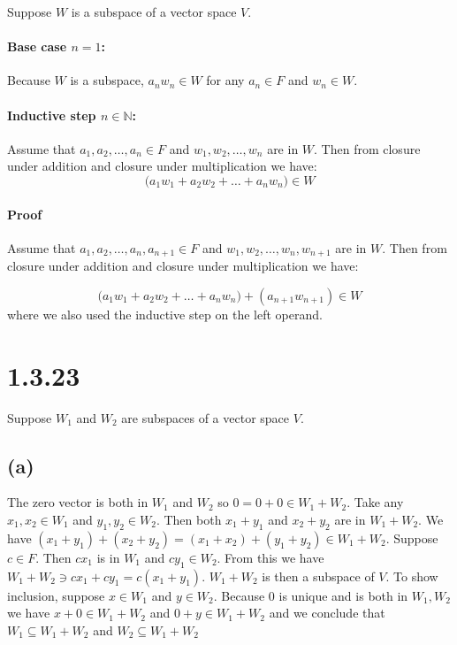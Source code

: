 \documentclass{article}
\begin{document}
Suppose \(W\) is a subspace of a vector space \(V\).

\paragraph{Base case \(n=1\):} 
Because \(W\) is a subspace, \(a_{n}w_{n} \in W\) for any \(a_{n} \in F\) and \(w_{n} \in W\).

\paragraph{Inductive step \(n \in \mathbb{N}\):}
Assume that \(a_{1}, a_{2}, \dots, a_{n} \in F\) and \(w_{1}, w_{2}, \dots, w_{n}\) are in \(W\).
Then from closure under addition and closure under multiplication we have:
\begin{equation*}
    \Big(a_{1}w_{1} + a_{2}w_{2} + \dots + a_{n}w_{n}\Big) \in W
\end{equation*}

\paragraph{Proof}

Assume that \(a_{1}, a_{2}, \dots, a_{n}, a_{n+1} \in F\) and \(w_{1}, w_{2}, \dots, w_{n}, w_{n+1}\) are in \(W\).
Then from closure under addition and closure under multiplication we have:

\begin{equation*}
    \Big(a_{1}w_{1} + a_{2}w_{2} + \dots + a_{n}w_{n}\Big) + (a_{n+1}w_{n+1}) \in W
\end{equation*}
where we also used the inductive step on the left operand.

\section*{1.3.23}

Suppose \(W_{1}\) and \(W_{2}\) are subspaces of a vector space \(V\).

\subsection*{(a)}

The zero vector is both in \(W_{1}\) and \(W_{2}\) so \(0 = 0 + 0 \in W_{1} + W_{2}\).
Take any \(x_{1}, x_{2} \in W_{1}\) and \(y_{1}, y_{2} \in W_{2}\). Then both
\(x_{1} + y_{1}\) and \(x_{2} + y_{2}\) are in \(W_{1} + W_{2}\).
We have \((x_{1} + y_{1}) + (x_{2} + y_{2}) = (x_{1} + x_{2}) + (y_{1} + y_{2}) \in W_{1} + W_{2}\).
Suppose \(c \in F\). Then \(cx_{1}\) is in \(W_{1}\) and \(cy_{1} \in W_{2}\). From this we have
\(W_{1} + W_{2} \ni cx_{1} + cy_{1} = c(x_{1} + y_{1})\). \(W_{1} + W_{2}\) is then a subspace of \(V\).
To show inclusion, suppose \(x \in W_{1}\) and \(y \in W_{2}\). Because \(0\) is unique and
is both in \(W_{1}, W_{2}\) we have \(x + 0 \in W_{1} + W_{2}\) and \(0 + y \in W_{1} + W_{2}\)
and we conclude that \(W_{1} \subseteq W_{1} + W_{2}\) and \(W_{2} \subseteq W_{1} + W_{2}\)
\end{document}
